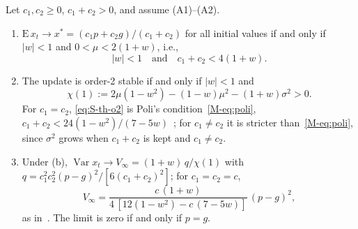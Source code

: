 \begin{thS}
\label{prop:S-pso-stability}
Let $c_1,c_2\ge0$, $c_1+c_2>0$, and assume (A1)--(A2).
\begin{enumerate}
\item[(a)] $\mathrm E\,x_t\to x^*=(c_1p+c_2g)/(c_1+c_2)$ for all initial values if and only if $\lvert w\rvert<1$ and $0<\mu<2(1+w)$, i.e.,
\begin{equation}
\lvert w\rvert<1\quad\text{and}\quad c_1+c_2<4(1+w).
\label{eq:S-th-o1}
\end{equation}
\item[(b)] The update is order-2 stable if and only if $\lvert w\rvert<1$ and
\begin{equation}
\chi(1):=2\mu(1-w^2)-(1-w)\mu^2-(1+w)\sigma^2>0 .
\label{eq:S-th-o2}
\end{equation}
For $c_1=c_2$, \eqref{eq:S-th-o2} is Poli's condition~\eqref{M-eq:poli}, $c_1+c_2<24(1-w^2)/(7-5w)$~\cite{Poli2009}; for $c_1\ne c_2$ it is stricter than~\eqref{M-eq:poli}, since $\sigma^2$ grows when $c_1+c_2$ is kept and $c_1\ne c_2$.
\item[(c)] Under (b), $\operatorname{Var}x_t\to V_\infty=(1+w)\,q/\chi(1)$ with $q=c_1^2c_2^2(p-g)^2/[6(c_1+c_2)^2]$; for $c_1=c_2=c$,
\begin{equation}
V_\infty=\frac{c\,(1+w)}{4\,[12(1-w^2)-c\,(7-5w)]}\,(p-g)^2 ,
\label{eq:S-th-vinf}
\end{equation}
as in~\cite{Poli2009}. The limit is zero if and only if $p=g$.
\end{enumerate}
\end{thS}

